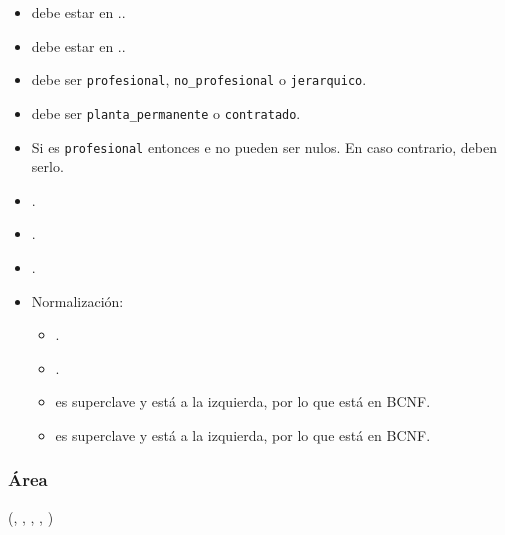    \begin{itemize}
        \item {} debe estar en ..
        \item {} debe estar en ..
        \item {} debe ser \verb|profesional|, \verb|no_profesional|
            o \verb|jerarquico|.
        \item {} debe ser \verb|planta_permanente| o 
            \verb|contratado|.
        \item Si  es \verb|profesional| entonces 
             e  no pueden ser nulos.
            En caso contrario, deben serlo.
        \item {}.
        \item {}.
        \item {}.

        \item Normalización:
            
            \begin{itemize}

                \item {}.

                \item {}.
                    
                \item {} es superclave y está a la izquierda, por lo
                    que está en BCNF.
                \item {} es superclave y está a la izquierda, por lo
                    que está en BCNF.
            \end{itemize}
    \end{itemize}


\subsubsection{Área}
    (, , , , 
        )

